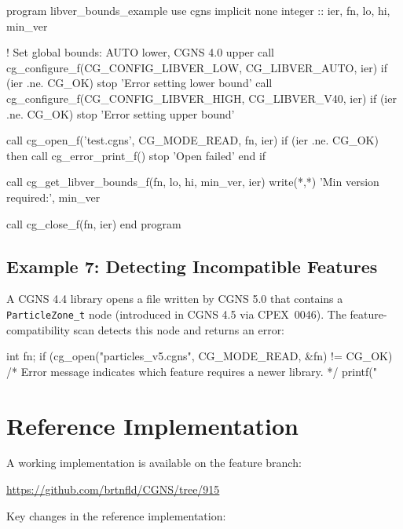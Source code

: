 \documentclass[11pt,letterpaper]{article}
\makeatletter
\let\cgns@orig@lstlisting\lstlisting
\let\cgns@endorig@lstlisting\endlstlisting
\renewenvironment{lstlisting}
  {\par\needspace{5\baselineskip}\nolinenumbers\cgns@orig@lstlisting}
  {\cgns@endorig@lstlisting\par\linenumbers}
\makeatother
\begin{document}
\begin{lstlisting}[language=Fortran]
program libver_bounds_example
  use cgns
  implicit none
  integer :: ier, fn, lo, hi, min_ver

  ! Set global bounds: AUTO lower, CGNS 4.0 upper
  call cg_configure_f(CG_CONFIG_LIBVER_LOW,  CG_LIBVER_AUTO, ier)
  if (ier .ne. CG_OK) stop 'Error setting lower bound'
  call cg_configure_f(CG_CONFIG_LIBVER_HIGH, CG_LIBVER_V40,  ier)
  if (ier .ne. CG_OK) stop 'Error setting upper bound'

  call cg_open_f('test.cgns', CG_MODE_READ, fn, ier)
  if (ier .ne. CG_OK) then
     call cg_error_print_f()
     stop 'Open failed'
  end if

  call cg_get_libver_bounds_f(fn, lo, hi, min_ver, ier)
  write(*,*) 'Min version required:', min_ver

  call cg_close_f(fn, ier)
end program
\end{lstlisting}

\subsection{Example 7: Detecting Incompatible Features}

A CGNS 4.4 library opens a file written by CGNS 5.0 that contains
a \texttt{ParticleZone\_t} node (introduced in CGNS 4.5 via
CPEX~0046).  The feature-compatibility scan detects this node and
returns an error:

\begin{lstlisting}[language=C]
int fn;
if (cg_open("particles_v5.cgns", CG_MODE_READ, &fn)
        != CG_OK) {
    /* Error message indicates which feature requires
       a newer library. */
    printf("%s\n", cg_get_error());
}
\end{lstlisting}

\section{Reference Implementation}

A working implementation is available on the feature branch:

\begin{center}
\url{https://github.com/brtnfld/CGNS/tree/915}
\end{center}

Key changes in the reference implementation:
\end{document}
